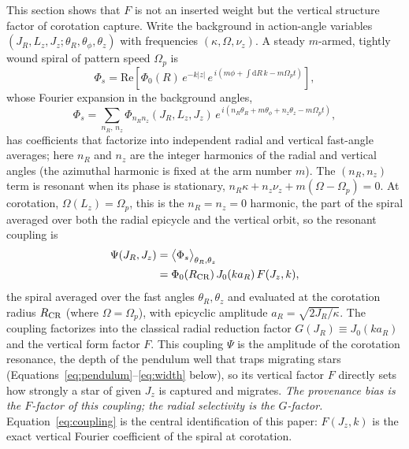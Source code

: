 \documentclass[twocolumn]{aastex701}
\newcommand{\Jz}{J_z}
\newcommand{\Lz}{L_z}
\newcommand{\JR}{J_R}
\begin{document}
This section shows that $F$ is not an inserted weight but the vertical structure factor
of corotation capture. Write the background in action-angle variables
$(\JR,\Lz,\Jz;\theta_R,\theta_\phi,\theta_z)$ with frequencies
$(\kappa,\Omega,\nu_z)$. A steady $m$-armed, tightly wound spiral of pattern speed
$\Omega_p$ is
%
\begin{equation}
  \Phi_s = \mathrm{Re}\!\left[\Phi_0(R)\,e^{-k|z|}\,
  e^{\,i(m\phi + \int\! \mathrm{d}R\, k - m\Omega_p t)}\right],
\end{equation}
%
whose Fourier expansion in the background angles,
%
\begin{equation}
  \Phi_s = \sum_{n_R,\,n_z} \Phi_{n_R n_z}(\JR,\Lz,\Jz)\,
  e^{\,i(n_R\theta_R + m\theta_\phi + n_z\theta_z - m\Omega_p t)},
\end{equation}
%
has coefficients that factorize into independent radial and vertical fast-angle
averages; here $n_R$ and $n_z$ are the integer harmonics of the radial and vertical
angles (the azimuthal harmonic is fixed at the arm number $m$). The $(n_R,n_z)$ term
is resonant when its phase is stationary, $n_R\kappa + n_z\nu_z + m(\Omega-\Omega_p)=0$.
At corotation, $\Omega(\Lz)=\Omega_p$, this is the $n_R=n_z=0$ harmonic, the part of
the spiral averaged over both the radial epicycle and the vertical orbit, so the
resonant coupling is
%
\begin{equation}
\begin{aligned}
  \Psi(\JR,\Jz) &= \big\langle \Phi_s \big\rangle_{\theta_R,\theta_z} \\
                &= \Phi_0(R_{\rm CR})\,J_0(k a_R)\,F(\Jz,k),
\end{aligned}
\label{eq:coupling}
\end{equation}
%
the spiral averaged over the fast angles $\theta_R,\theta_z$ and evaluated at the
corotation radius $R_{\rm CR}$ (where $\Omega=\Omega_p$), with epicyclic amplitude
$a_R=\sqrt{2\JR/\kappa}$. The coupling factorizes into the classical radial reduction
factor $G(\JR)\equiv J_0(ka_R)$
\citep[the Kalnajs/Bessel factor;][]{BinneyTremaine2008} and the vertical form
factor $F$. This coupling $\Psi$ is the amplitude of the corotation resonance, the
depth of the pendulum well that traps migrating stars
(Equations~\eqref{eq:pendulum}--\eqref{eq:width} below), so its vertical factor $F$
directly sets how strongly a star of given $\Jz$ is captured and migrates.
\emph{The provenance bias is the $F$-factor of this coupling; the
\citet{DanielWyse2015} radial selectivity is the $G$-factor.} Equation~\eqref{eq:coupling} is the central identification of this paper: $F(\Jz,k)$ is the
exact vertical Fourier coefficient of the spiral at corotation.
\end{document}
